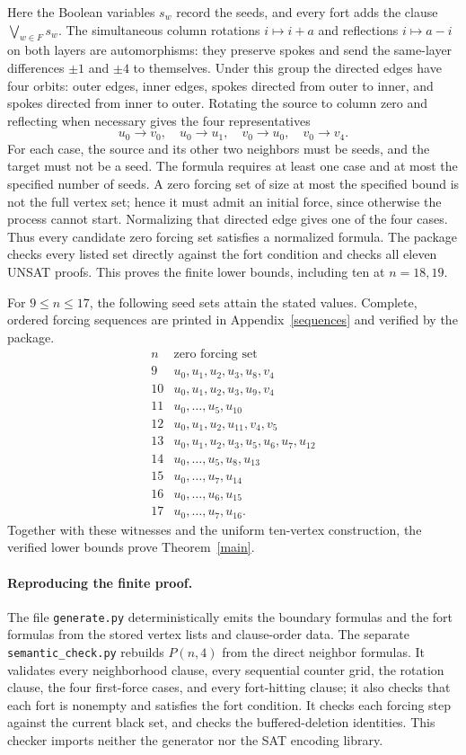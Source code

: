 \documentclass[10pt,a4paper]{article}
\begin{document}
Here the Boolean variables $s_w$ record the seeds, and every fort adds
the clause $\bigvee_{w\in F}s_w$. The simultaneous column rotations $i\mapsto i+a$ and reflections
$i\mapsto a-i$ on both layers are automorphisms: they preserve spokes and
send the same-layer differences $\pm1$ and $\pm4$ to themselves.
Under this group the directed edges have four orbits: outer edges,
inner edges, spokes directed from outer to inner, and spokes directed
from inner to outer. Rotating the source to column zero and reflecting
when necessary gives the four representatives
\[
u_0\to v_0,\quad u_0\to u_1,\quad
v_0\to u_0,\quad v_0\to v_4.
\]
For each case, the source and its other two neighbors must be seeds,
and the target must not be a seed. The formula requires at least one
case and at most the specified number of seeds. A zero forcing set of size at most the specified bound is not the full
vertex set; hence it must admit an initial force, since otherwise the
process cannot start. Normalizing that directed edge gives one of the
four cases. Thus every candidate zero forcing set satisfies a normalized
formula. The package checks every listed set directly against the fort
condition and checks all eleven UNSAT proofs. This proves the finite lower
bounds, including ten at $n=18,19$.

For $9\le n\le17$, the following seed sets attain the stated values.
Complete, ordered forcing sequences are printed in Appendix~\ref{sequences}
and verified by the package.
\[
\begin{array}{c|l}
n&\text{zero forcing set}\\\hline
9&u_0,u_1,u_2,u_3,u_8,v_4\\
10&u_0,u_1,u_2,u_3,u_9,v_4\\
11&u_0,\ldots,u_5,u_{10}\\
12&u_0,u_1,u_2,u_{11},v_4,v_5\\
13&u_0,u_1,u_2,u_3,u_5,u_6,u_7,u_{12}\\
14&u_0,\ldots,u_5,u_8,u_{13}\\
15&u_0,\ldots,u_7,u_{14}\\
16&u_0,\ldots,u_6,u_{15}\\
17&u_0,\ldots,u_7,u_{16}.
\end{array}
\]
Together with these witnesses and the uniform ten-vertex construction,
the verified lower bounds prove Theorem~\ref{main}.

\paragraph{Reproducing the finite proof.}
The file \texttt{generate.py} deterministically emits the boundary formulas
and the fort formulas from the stored vertex lists and clause-order data.
The separate \texttt{semantic\_check.py} rebuilds $P(n,4)$ from the direct
neighbor formulas. It validates every neighborhood clause, every sequential
counter grid, the rotation clause, the four first-force cases, and every
fort-hitting clause; it also checks that each fort is nonempty and satisfies
the fort condition. It checks each forcing step against the current black
set, and checks the buffered-deletion identities. This checker imports
neither the generator nor the SAT encoding library.
\end{document}
